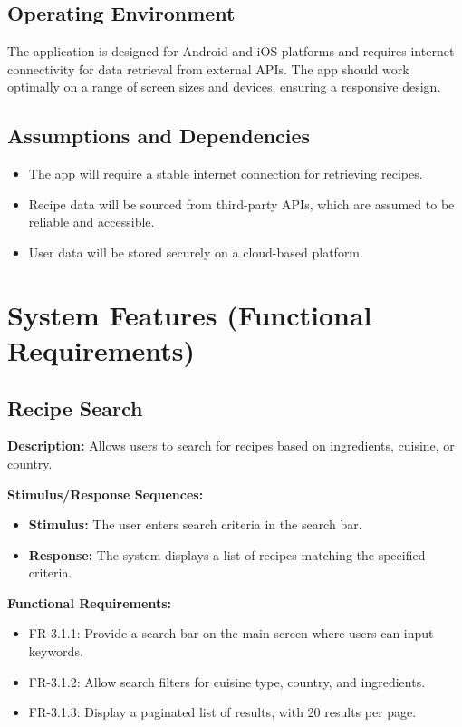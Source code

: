 \documentclass[12pt]{article}
\begin{document}
\subsection{Operating Environment}
The application is designed for Android and iOS platforms and requires internet connectivity for data retrieval from external APIs. The app should work optimally on a range of screen sizes and devices, ensuring a responsive design.

\subsection{Assumptions and Dependencies}
\begin{itemize}
    \item The app will require a stable internet connection for retrieving recipes.
    \item Recipe data will be sourced from third-party APIs, which are assumed to be reliable and accessible.
    \item User data will be stored securely on a cloud-based platform.
\end{itemize}

\newpage
\section{System Features (Functional Requirements)}

\subsection{Recipe Search}
\textbf{Description:} Allows users to search for recipes based on ingredients, cuisine, or country.

\textbf{Stimulus/Response Sequences:}
\begin{itemize}
    \item \textbf{Stimulus:} The user enters search criteria in the search bar.
    \item \textbf{Response:} The system displays a list of recipes matching the specified criteria.
\end{itemize}

\textbf{Functional Requirements:}
\begin{itemize}
    \item FR-3.1.1: Provide a search bar on the main screen where users can input keywords.
    \item FR-3.1.2: Allow search filters for cuisine type, country, and ingredients.
    \item FR-3.1.3: Display a paginated list of results, with 20 results per page.
\end{itemize}
\end{document}
